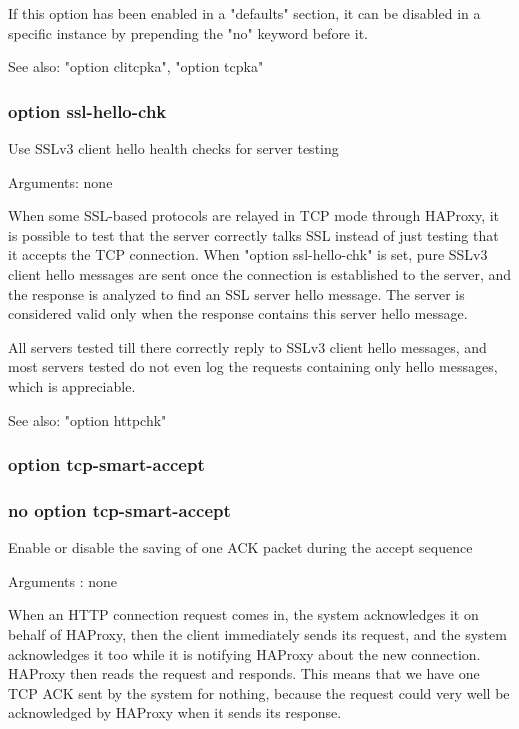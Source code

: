   If this option has been enabled in a "defaults" section, it can be disabled
  in a specific instance by prepending the "no" keyword before it.

  See also: "option clitcpka", "option tcpka"

\subsubsection{option ssl-hello-chk}


  Use SSLv3 client hello health checks for server testing


  Arguments: none

  When some SSL-based protocols are relayed in TCP mode through HAProxy, it is
  possible to test that the server correctly talks SSL instead of just testing
  that it accepts the TCP connection. When "option ssl-hello-chk" is set, pure
  SSLv3 client hello messages are sent once the connection is established to
  the server, and the response is analyzed to find an SSL server hello message.
  The server is considered valid only when the response contains this server
  hello message.

  All servers tested till there correctly reply to SSLv3 client hello messages,
  and most servers tested do not even log the requests containing only hello
  messages, which is appreciable.

  See also: "option httpchk"

\subsubsection{option tcp-smart-accept}
\subsubsection{no option tcp-smart-accept}


  Enable or disable the saving of one ACK packet during the accept sequence


  Arguments : none

  When an HTTP connection request comes in, the system acknowledges it on
  behalf of HAProxy, then the client immediately sends its request, and the
  system acknowledges it too while it is notifying HAProxy about the new
  connection. HAProxy then reads the request and responds. This means that we
  have one TCP ACK sent by the system for nothing, because the request could
  very well be acknowledged by HAProxy when it sends its response.

